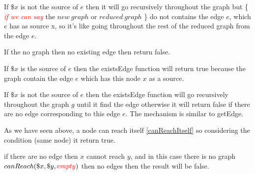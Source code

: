 
If $\$x$ is not the source of $e$ then it will go recursively throughout the graph but \{ \textit{\textcolor{red} {if we can say}} the $new\ graph$ or $reduced\ graph$ \} do not contains the edge $e$, which $e$ has as source x, so it's like going throughout the rest of the reduced graph from the edge $e$.

\bigskip\noindent

If the no graph then no existing edge then return false.

If $\$x$ is the source of $e$ then the existsEdge function will return true because the graph contain the edge $e$ which has this node $x$ as a source.

\bigskip\noindent

If $\$x$ is not the source of $e$ then the existsEdge function will go recursively throughout the graph $g$ until it find the edge otherwise it will return false if there are no edge corresponding to this edge $e$.
The mechanism is similar to getEdge. 

\bigskip\noindent

As we have seen above, a node can reach itself \ref{canReachItself}\label{axiomcanReach} so considering the condition (same node) it return true.


if there are no edge then $x$ cannot reach $y$, and in this case there is no graph $ canReach(\$x,\$y,\textcolor{red}{empty})$ then no edges then the result will be false.

